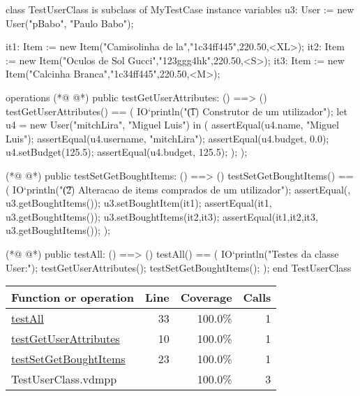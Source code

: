 \begin{vdmpp}[breaklines=true]
class TestUserClass is subclass of MyTestCase
 instance variables
  u3: User := new User("pBabo", "Paulo Babo");
  
  it1: Item := new Item("Camisolinha de la","1c34ff445",220.50,<XL>);
  it2: Item := new Item("Oculos de Sol Gucci","123ggg4hk",220.50,<S>);
  it3: Item := new Item("Calcinha Branca","1c34ff445",220.50,<M>);
  
 operations
(*@
\label{testGetUserAttributes:10}
@*)
  public testGetUserAttributes: () ==> ()
   testGetUserAttributes() == (
     IO`println("\t (1) Construtor de um utilizador");
    let u4 = new User("mitchLira", "Miguel Luis") in (
     assertEqual(u4.name, "Miguel Luis");
     assertEqual(u4.username, "mitchLira");
     assertEqual(u4.budget, 0.0);
     u4.setBudget(125.5);
     assertEqual(u4.budget, 125.5);
    );
  ); 
  
   
(*@
\label{testSetGetBoughtItems:23}
@*)
  public testSetGetBoughtItems: () ==> ()
   testSetGetBoughtItems() == (
     IO`println("\t (2) Alteracao de items comprados de um utilizador");
    assertEqual({}, u3.getBoughtItems());
    u3.setBoughtItem(it1);
    assertEqual({it1}, u3.getBoughtItems());
    u3.setBoughtItems({it2,it3});
    assertEqual({it1,it2,it3}, u3.getBoughtItems());
   );
  
(*@
\label{testAll:33}
@*)
  public testAll: () ==> ()
   testAll() == (
   IO`println("Testes da classe User:");
    testGetUserAttributes();
    testSetGetBoughtItems();
   );
end TestUserClass
\end{vdmpp}
\bigskip
\begin{longtable}{|l|r|r|r|}
\hline
Function or operation & Line & Coverage & Calls \\
\hline
\hline
\hyperref[testAll:33]{testAll} & 33&100.0\% & 1 \\
\hline
\hyperref[testGetUserAttributes:10]{testGetUserAttributes} & 10&100.0\% & 1 \\
\hline
\hyperref[testSetGetBoughtItems:23]{testSetGetBoughtItems} & 23&100.0\% & 1 \\
\hline
\hline
TestUserClass.vdmpp & & 100.0\% & 3 \\
\hline
\end{longtable}

